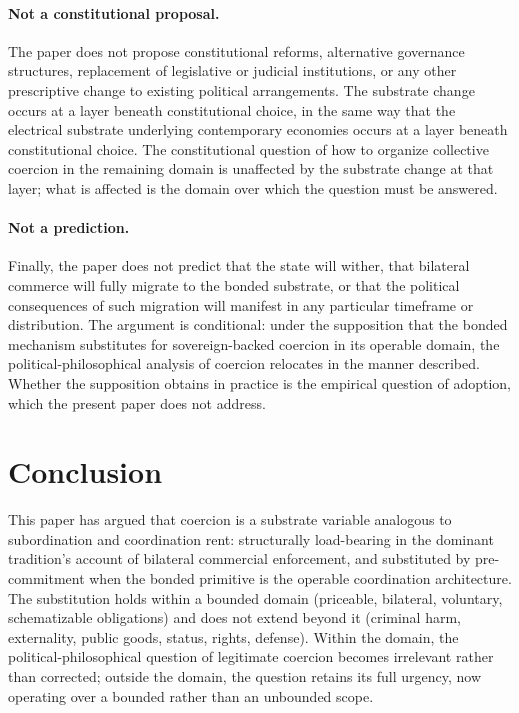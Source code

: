 \documentclass[11pt,a4paper]{article}
\theoremstyle{remark}
\begin{document}
\paragraph{Not a constitutional proposal.}
The paper does not propose constitutional reforms, alternative
governance structures, replacement of legislative or judicial
institutions, or any other prescriptive change to existing
political arrangements. The substrate change occurs at a layer
beneath constitutional choice, in the same way that the
electrical substrate underlying contemporary economies occurs at
a layer beneath constitutional choice. The constitutional
question of how to organize collective coercion in the remaining
domain is unaffected by the substrate change at that layer; what
is affected is the domain over which the question must be
answered.

\paragraph{Not a prediction.}
Finally, the paper does not predict that the state will wither,
that bilateral commerce will fully migrate to the bonded
substrate, or that the political consequences of such migration
will manifest in any particular timeframe or distribution. The
argument is conditional: under the supposition that the bonded
mechanism substitutes for sovereign-backed coercion in its
operable domain, the political-philosophical analysis of
coercion relocates in the manner described. Whether the
supposition obtains in practice is the empirical question of
adoption, which the present paper does not address.

\section{Conclusion}
\label{sec:conclusion}

This paper has argued that coercion is a substrate variable
analogous to subordination and coordination rent: structurally
load-bearing in the dominant tradition's account of bilateral
commercial enforcement, and substituted by pre-commitment when
the bonded primitive is the operable coordination architecture.
The substitution holds within a bounded domain (priceable,
bilateral, voluntary, schematizable obligations) and does not
extend beyond it (criminal harm, externality, public goods,
status, rights, defense). Within the domain, the
political-philosophical question of legitimate coercion becomes
irrelevant rather than corrected; outside the domain, the
question retains its full urgency, now operating over a bounded
rather than an unbounded scope.
\end{document}
